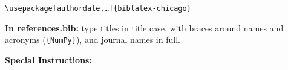 \documentclass[12pt,letterpaper]{article}
\newcommand{\stylesetup}{\texttt{\textbackslash usepackage[authordate,\ldots]\{biblatex-chicago\}}}}
\newcommand{\stylesetup}{\texttt{style=\stylecode}}}
\newlength{\stylehead}\setlength{\stylehead}{1.5\baselineskip}
\begin{document}
\vspace*{\stylehead}
\noindent\stylesetup

\begin{itemize}[nosep,leftmargin=1.5em,topsep=0.25\baselineskip]
\stylefeatures
\end{itemize}

\par\smallskip\noindent\textbf{In references.bib:} type titles in title case, with braces around names and acronyms (\texttt{\{NumPy\}}), and journal names in full. \stylecase\par

\ifdefined\stylespecial
  \par\smallskip\noindent\textbf{Special Instructions:} \stylespecial\par
\fi

\nocite{Adriazola2021,Halmos1973,Harris2020,KnuthPlass1981,Lamport1994,biblatex,Mittelbach2023,EberhardtWiki}

\printbibliography[title={References}]
\end{document}
